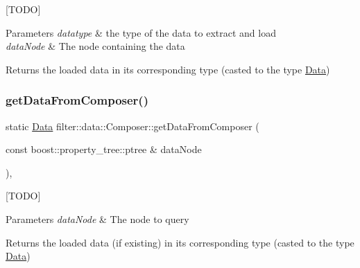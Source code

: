 \mbox{[}T\+O\+DO\mbox{]} 
\begin{DoxyParams}{Parameters}
{\em datatype} & the type of the data to extract and load \\
\hline
{\em data\+Node} & The node containing the data \\
\hline
\end{DoxyParams}
\begin{DoxyReturn}{Returns}
the loaded data in its corresponding type (casted to the type \hyperlink{classfilter_1_1data_1_1_data}{Data}) 
\end{DoxyReturn}
\mbox{\label{classfilter_1_1data_1_1_composer_a19c9dae95476fa0f3260a3fa25e49040}} 
\subsubsection{\texorpdfstring{get\+Data\+From\+Composer()}{getDataFromComposer()}\hspace{0.1cm}{\footnotesize\ttfamily [2/2]}}
{\footnotesize\ttfamily static \hyperlink{classfilter_1_1data_1_1_data}{Data} filter\+::data\+::\+Composer\+::get\+Data\+From\+Composer (\begin{DoxyParamCaption}\item[{const boost\+::property\+\_\+tree\+::ptree \&}]{data\+Node }\end{DoxyParamCaption})\hspace{0.3cm}{\ttfamily [inline]}, {\ttfamily [static]}}

\mbox{[}T\+O\+DO\mbox{]} 
\begin{DoxyParams}{Parameters}
{\em data\+Node} & The node to query \\
\hline
\end{DoxyParams}
\begin{DoxyReturn}{Returns}
the loaded data (if existing) in its corresponding type (casted to the type \hyperlink{classfilter_1_1data_1_1_data}{Data}) 
\end{DoxyReturn}
\mbox{\label{classfilter_1_1data_1_1_composer_a77e70226b7d20b2d13995e37833ec88c}} 
